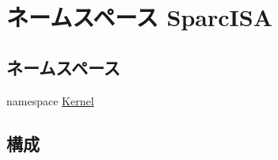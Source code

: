\hypertarget{namespaceSparcISA}{
\section{ネームスペース SparcISA}
\label{namespaceSparcISA}
}
\subsection*{ネームスペース}
\begin{DoxyCompactItemize}
\item 
namespace \hyperlink{namespaceSparcISA_1_1Kernel}{Kernel}
\end{DoxyCompactItemize}
\subsection*{構成}
